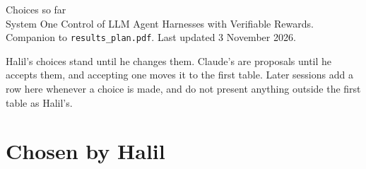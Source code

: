 \documentclass[10pt]{article}
\begin{document}
\begin{center}
  {\Large Choices so far}\\[3pt]
  System One Control of LLM Agent Harnesses with Verifiable Rewards. Companion to \texttt{results\_plan.pdf}. Last updated 3 November 2026.
\end{center}

Halil's choices stand until he changes them. Claude's are proposals until he accepts them, and accepting one moves it to the first table. Later sessions add a row here whenever a choice is made, and do not present anything outside the first table as Halil's.

\section{Chosen by Halil}
\end{document}
